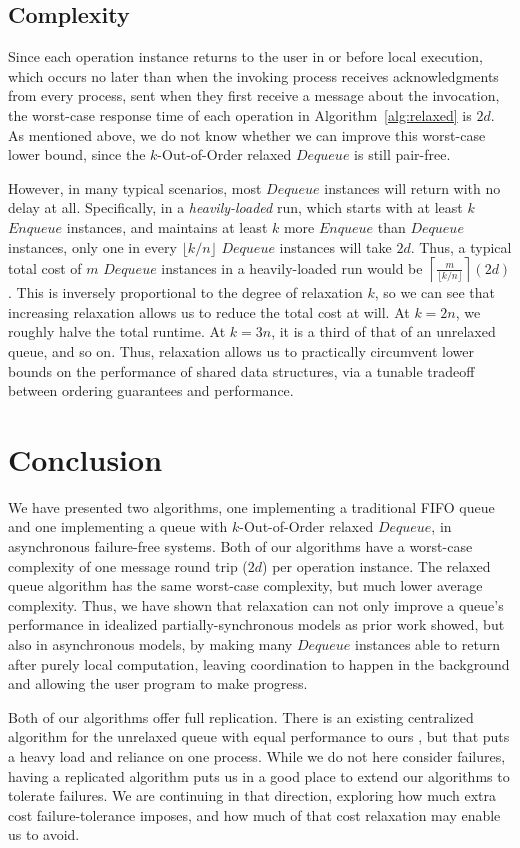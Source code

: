 \documentclass[a4paper,anonymous,USenglish]{lipics-v2021}
\theoremstyle{definition}
\begin{document}
\subsection{Complexity}

Since each operation instance returns to the user in or before local execution, which occurs no later than when the invoking process receives acknowledgments from every process, sent when they first receive a message about the invocation, the worst-case response time of each operation in Algorithm~\ref{alg:relaxed} is $2d$.  As mentioned above, we do not know whether we can improve this worst-case lower bound, since the $k$-Out-of-Order relaxed $Dequeue$ is still pair-free.

However, in many typical scenarios, most $Dequeue$ instances will return with no delay at all.  Specifically, in a \emph{heavily-loaded} run, which starts with at least $k$ $Enqueue$ instances, and maintains at least $k$ more $Enqueue$ than $Dequeue$ instances, only one in every $\lfloor k/n\rfloor$ $Dequeue$ instances will take $2d$.  Thus, a typical total cost of $m$ $Dequeue$ instances in a heavily-loaded run would be $\left\lceil\frac{m}{\lfloor k/n\rfloor}\right\rceil(2d)$.  This is inversely proportional to the degree of relaxation $k$, so we can see that increasing relaxation allows us to reduce the total cost at will.  At $k=2n$, we roughly halve the total runtime.  At $k=3n$, it is a third of that of an unrelaxed queue, and so on.  Thus, relaxation allows us to practically circumvent lower bounds on the performance of shared data structures, via a tunable tradeoff between ordering guarantees and performance.

\section{Conclusion}

We have presented two algorithms, one implementing a traditional FIFO queue and one implementing a queue with $k$-Out-of-Order relaxed $Dequeue$, in asynchronous failure-free systems.  Both of our algorithms have a worst-case complexity of one message round trip ($2d$) per operation instance.  The relaxed queue algorithm has the same worst-case complexity, but much lower average complexity.  Thus, we have shown that relaxation can not only improve a queue's performance in idealized partially-synchronous models as prior work showed, but also in asynchronous models, by making many $Dequeue$ instances able to return after purely local computation, leaving coordination to happen in the background and allowing the user program to make progress.

Both of our algorithms offer full replication.  There is an existing centralized algorithm for the unrelaxed queue with equal performance to ours \cite{Lynch96}, but that puts a heavy load and reliance on one process.  While we do not here consider failures, having a replicated algorithm puts us in a good place to extend our algorithms to tolerate failures.  We are continuing in that direction, exploring how much extra cost failure-tolerance imposes, and how much of that cost relaxation may enable us to avoid.


\end{document}
